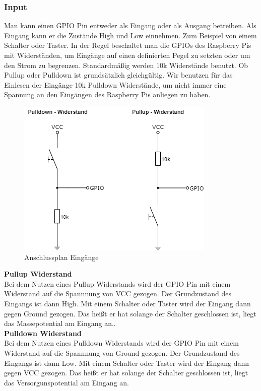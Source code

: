 \subsubsection{Input}

Man kann einen GPIO Pin entweder als Eingang oder als Ausgang betreiben. Als Eingang kann er die Zustände High und Low einnehmen. Zum Beispiel von einem Schalter oder Taster. In der Regel beschaltet man die GPIOs des Raspberry Pis mit Widerständen, um Eingänge auf einen definierten Pegel zu setzten oder um den Strom zu begrenzen. Standardmäßig werden 10k Widerstände benutzt. Ob Pullup oder Pulldown ist grundsätzlich gleichgültig. Wir benutzen für das Einlesen der Eingänge 10k Pulldown Widerstände, um nicht immer eine Spannung an den Eingängen des Raspberry Pis anliegen zu haben.

\begin{figure}[H]
	\begin{center}
		\includegraphics[scale=0.8]{figures/hcis/input.png}
			\caption{Anschlussplan Eingänge}
			\label{fig:input}
	\end{center}
\end{figure}

\textbf{Pullup Widerstand}\\
Bei dem Nutzen eines Pullup Widerstands wird der GPIO Pin mit einem Widerstand auf die Spannnung von VCC gezogen. Der Grundzustand des Eingangs ist dann High. Mit einem Schalter oder Taster wird der Eingang dann gegen Ground gezogen. Das heißt er hat solange der Schalter geschlossen ist, liegt das Massepotential am Eingang an..\\\medskip
\textbf{Pulldown Widerstand}\\
Bei dem Nutzen eines Pulldown Widerstands wird der GPIO Pin mit einem Widerstand auf die Spannnung von Ground gezogen. Der Grundzustand des Eingangs ist dann Low. Mit einem Schalter oder Taster wird der Eingang dann gegen VCC gezogen. Das heißt er hat solange der Schalter geschlossen ist, liegt das Versorgunspotential am Eingang an.

